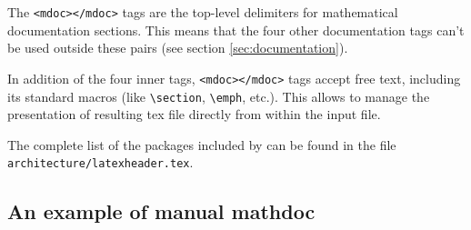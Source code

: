 \documentclass[a4paper,10pt]{book}
\begin{document}
The \lstinline!<mdoc></mdoc>! tags are the top-level delimiters for \faust mathematical documentation sections. This means that the four other documentation tags can't be used outside these pairs (see section \ref{sec:documentation}).

In addition of the four inner tags, \lstinline!<mdoc></mdoc>! tags accept free \latex text, including its standard macros (like \lstinline!\section!, \lstinline!\emph!, etc.). This allows to manage the presentation of resulting tex file directly from within the input \faust file. 

The complete list of the \latex packages included by \faust can be found in the file \lstinline!architecture/latexheader.tex!.

\subsection{An example of manual mathdoc}
\label{sec:ex-mathdoc}
\end{document}
